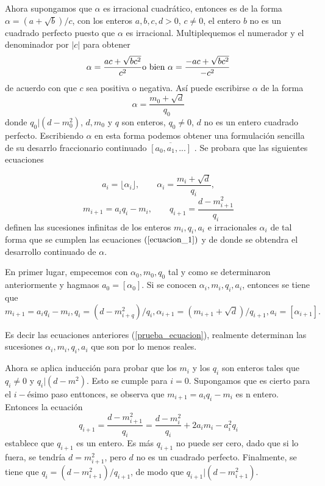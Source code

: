 \documentclass[11pt, article]{article}
\begin{document}
    Ahora supongamos que $\alpha$ es irracional cuadrático, entonces es de la forma $\alpha=(a+\sqrt{b})/c$, con los enteros $a,b,c,d>0$, $c\not=0$, el entero $b$ no es un cuadrado perfecto puesto que $\alpha$ es irracional. Multiplequemos el numerador y el denominador por $|c|$ para obtener 
        \[
        \alpha = \dfrac{ac + \sqrt{bc^2}}{c^2} \textnormal{o bien } \alpha=\dfrac{-ac+\sqrt{bc^2}}{-c^2}
        \]
    de acuerdo con que $c$ sea positiva o negativa. Así puede escribirse $\alpha$ de la forma
        \[
        \alpha = \dfrac{m_0+\sqrt{d}}{q_0}
        \]
    donde $q_0|(d-m_0^2)$, $d,m_0$ y $q$ son enteros, $q_0\not=0$, $d$ no es un entero cuadrado perfecto. Escribiendo $\alpha$ en esta forma podemos obtener una formulación sencilla de su desarrlo fraccionario continuado $\overline{[a_0,a_1,...]}$ . Se probara que las siguientes ecuaciones 

        \begin{equation}
        a_i= \lfloor \alpha_i \rfloor, \qquad \alpha_i=\dfrac{m_i+\sqrt{d}}{q_i}, \label{prueba_ecuacion}
        \end{equation}
        \[
        m_{i+1}=a_iq_i-m_i, \qquad q_{i+1}=\dfrac{d-m_{i+1}^2}{q_i}
        \] 
    definen las sucesiones infinitas de los enteros $m_i,q_i,a_i$ e irracionales $\alpha_i$ de tal forma que se cumplen las ecuaciones $(\ref{ecuacion_1})$ y de donde se obtendra el desarrollo continuado de $\alpha$.

    En primer lugar, empecemos con $\alpha_0,m_0,q_0$ tal y como se determinaron anteriormente  y hagmaos $a_0=[\alpha_0]$. Si se conocen $\alpha_i,m_i,q_i,a_i$, entonces se tiene que 
        \[
         m_{i+1}=a_iq_i - m_i, q_i=(d-m_{i+q}^2)/q_i, \alpha_{i+1}=(m_{i+1} + \sqrt{d})/q_{i+1}, a_i=[\alpha_{i+1}].
         \]
    
    Es decir las ecuaciones anteriores (\ref{prueba_ecuacion}), realmente determinan las sucesiones $\alpha_i,m_i,q_i,a_i$ que son por lo menos reales.
    
    Ahora se aplica inducción para probar que los $m_i$ y los $q_i$ son enteros tales que $q_i\not=0$ y $q_i|(d-m^2)$. Esto se cumple para $i=0$. Supongamos que es cierto para el $i-$ésimo paso enttonces, se observa que $m_{i+1}=a_iq_i-m_i$ es n entero. Entonces la ecuación 
         \[
        q_{i+1}=\dfrac{d-m_{i+1}^2}{q_i}=\dfrac{d-m_i^2}{q_i} + 2a_im_i-a_i^2q_i
        \]
    establece que $q_{i+1}$ es un entero. Es más $q_{i+1}$ no puede ser cero, dado que si lo fuera, se tendría $d=m^2_{i+1}$, pero $d$ no es un cuadrado perfecto. Finalmente, se tiene que $q_i=(d-m_{i+1}^2)/q_{i+1}$, de modo que $q_{i+1}|(d-m_{i+1}^2)$.
    
\end{document}
